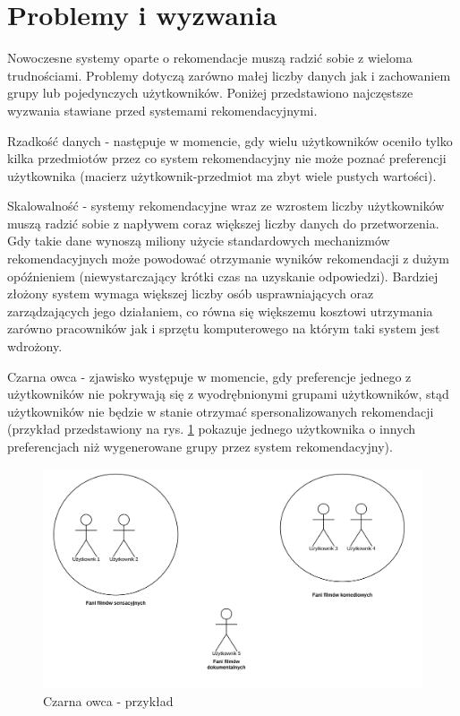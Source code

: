 \section{Problemy i wyzwania}
Nowoczesne systemy oparte o rekomendacje muszą radzić sobie z wieloma trudnościami. Problemy dotyczą zarówno małej liczby danych jak i zachowaniem grupy lub pojedynczych użytkowników. Poniżej przedstawiono najczęstsze wyzwania stawiane przed systemami rekomendacyjnymi.

Rzadkość danych - następuje w momencie, gdy wielu użytkowników oceniło tylko kilka przedmiotów przez co system rekomendacyjny nie może poznać preferencji użytkownika (macierz użytkownik-przedmiot ma zbyt wiele pustych wartości).

Skalowalność - systemy rekomendacyjne wraz ze wzrostem liczby użytkowników muszą radzić sobie z napływem coraz większej liczby danych do przetworzenia. Gdy takie dane wynoszą miliony użycie standardowych mechanizmów rekomendacyjnych może powodować otrzymanie wyników rekomendacji z dużym opóźnieniem (niewystarczający krótki czas na uzyskanie odpowiedzi). Bardziej złożony system wymaga większej liczby osób usprawniających oraz zarządzających jego działaniem, co równa się większemu kosztowi utrzymania zarówno pracowników jak i sprzętu komputerowego na którym taki system jest wdrożony.
    
Czarna owca - zjawisko występuje w momencie, gdy preferencje jednego z użytkowników nie pokrywają się z wyodrębnionymi grupami użytkowników, stąd użytkowników nie będzie w stanie otrzymać spersonalizowanych rekomendacji (przykład przedstawiony na rys. \ref{fig:grey-sheep} pokazuje jednego użytkownika o innych preferencjach niż wygenerowane grupy przez system rekomendacyjny).

\begin{figure}
    \centering
    \includegraphics[scale=0.5]{images/grey_sheep.png}
    \caption{Czarna owca - przykład}
    \label{fig:grey-sheep}
\end{figure}

